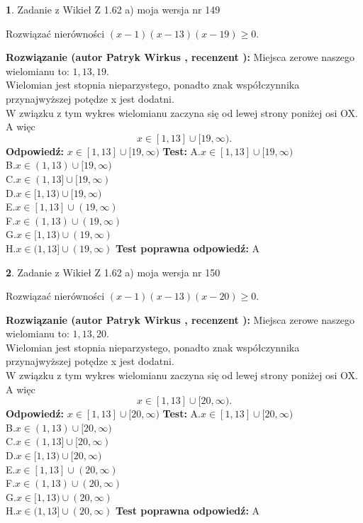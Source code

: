 \documentclass[12pt, a4paper]{article}
\theoremstyle{definition} %
\newtheorem{zad}{}
\newcommand{\zadStart}[1]{\begin{zad}#1\newline}
\newcommand{\zadStop}{\end{zad}}
\newcommand{\rozwStart}[2]{\noindent \textbf{Rozwiązanie (autor #1 , recenzent #2): }\newline}
\newcommand{\rozwStop}{\newline}
\newcommand{\odpStart}{\noindent \textbf{Odpowiedź:}\newline}
\newcommand{\odpStop}{\newline}
\newcommand{\testStart}{\noindent \textbf{Test:}\newline}
\newcommand{\testStop}{\newline}
\newcommand{\kluczStart}{\noindent \textbf{Test poprawna odpowiedź:}\newline}
\newcommand{\kluczStop}{\newline}
\begin{document}
\zadStart{Zadanie z Wikieł Z 1.62 a) moja wersja nr 149}

Rozwiązać nierówności $(x-1)(x-13)(x-19)\ge0$.
\zadStop
\rozwStart{Patryk Wirkus}{}
Miejsca zerowe naszego wielomianu to: $1, 13, 19$.\\
Wielomian jest stopnia nieparzystego, ponadto znak współczynnika przy\linebreak najwyższej potędze x jest dodatni.\\ W związku z tym wykres wielomianu zaczyna się od lewej strony poniżej osi OX. A więc $$x \in [1,13] \cup [19,\infty).$$
\rozwStop
\odpStart
$x \in [1,13] \cup [19,\infty)$
\odpStop
\testStart
A.$x \in [1,13] \cup [19,\infty)$\\
B.$x \in (1,13) \cup [19,\infty)$\\
C.$x \in (1,13] \cup [19,\infty)$\\
D.$x \in [1,13) \cup [19,\infty)$\\
E.$x \in [1,13] \cup (19,\infty)$\\
F.$x \in (1,13) \cup (19,\infty)$\\
G.$x \in [1,13) \cup (19,\infty)$\\
H.$x \in (1,13] \cup (19,\infty)$
\testStop
\kluczStart
A
\kluczStop



\zadStart{Zadanie z Wikieł Z 1.62 a) moja wersja nr 150}

Rozwiązać nierówności $(x-1)(x-13)(x-20)\ge0$.
\zadStop
\rozwStart{Patryk Wirkus}{}
Miejsca zerowe naszego wielomianu to: $1, 13, 20$.\\
Wielomian jest stopnia nieparzystego, ponadto znak współczynnika przy\linebreak najwyższej potędze x jest dodatni.\\ W związku z tym wykres wielomianu zaczyna się od lewej strony poniżej osi OX. A więc $$x \in [1,13] \cup [20,\infty).$$
\rozwStop
\odpStart
$x \in [1,13] \cup [20,\infty)$
\odpStop
\testStart
A.$x \in [1,13] \cup [20,\infty)$\\
B.$x \in (1,13) \cup [20,\infty)$\\
C.$x \in (1,13] \cup [20,\infty)$\\
D.$x \in [1,13) \cup [20,\infty)$\\
E.$x \in [1,13] \cup (20,\infty)$\\
F.$x \in (1,13) \cup (20,\infty)$\\
G.$x \in [1,13) \cup (20,\infty)$\\
H.$x \in (1,13] \cup (20,\infty)$
\testStop
\kluczStart
A
\kluczStop
\end{document}

